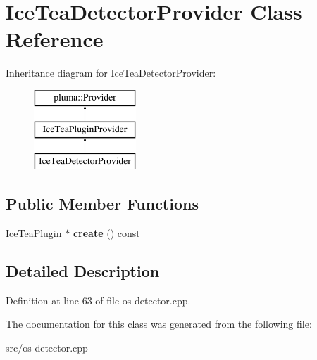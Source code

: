 \hypertarget{class_ice_tea_detector_provider}{}\section{Ice\+Tea\+Detector\+Provider Class Reference}
\label{class_ice_tea_detector_provider}
Inheritance diagram for Ice\+Tea\+Detector\+Provider\+:\begin{figure}[H]
\begin{center}
\leavevmode
\includegraphics[height=3.000000cm]{class_ice_tea_detector_provider}
\end{center}
\end{figure}
\subsection*{Public Member Functions}
\begin{DoxyCompactItemize}
\item 
\hyperlink{class_ice_tea_plugin}{Ice\+Tea\+Plugin} $\ast$ {\bfseries create} () const \hypertarget{class_ice_tea_detector_provider_acbf9d12f6a08d4ab4a7525ddc71e9826}{}\label{class_ice_tea_detector_provider_acbf9d12f6a08d4ab4a7525ddc71e9826}

\end{DoxyCompactItemize}


\subsection{Detailed Description}


Definition at line 63 of file os-\/detector.\+cpp.



The documentation for this class was generated from the following file\+:\begin{DoxyCompactItemize}
\item 
src/os-\/detector.\+cpp\end{DoxyCompactItemize}
